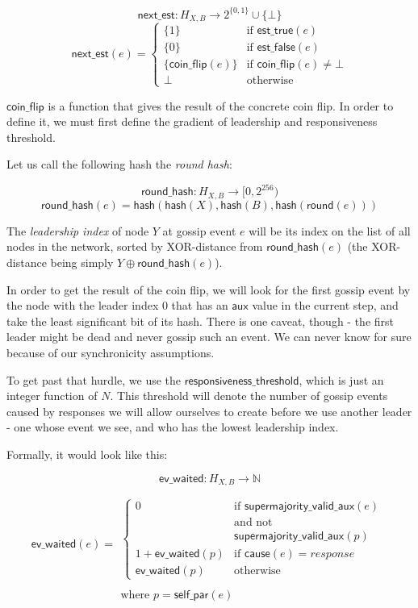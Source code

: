 \documentclass[a4paper,fleqn]{article}
\begin{document}
\[ \mathsf{next\_est}: H_{X,B} \to 2^{\{0,1\}} \cup \{ \bot \} \]
\[ \mathsf{next\_est}(e) = \left\{ \begin{array}{ll}
	\{1\} & \textrm{if $\mathsf{est\_true}(e)$} \\
	\{0\} & \textrm{if $\mathsf{est\_false}(e)$} \\
	\{\mathsf{coin\_flip}(e)\} & \textrm{if $\mathsf{coin\_flip}(e) \neq \bot$} \\
	\bot & \textrm{otherwise}
\end{array} \right. \]

$\mathsf{coin\_flip}$ is a function that gives the result of the concrete coin flip. In order to
define it, we must first define the gradient of leadership and responsiveness threshold.

Let us call the following hash the \emph{round hash}:

\[ \mathsf{round\_hash}: H_{X,B} \to [0, 2^{256}) \]
\[ \mathsf{round\_hash}(e) = \mathsf{hash}( \mathsf{hash}(X), \mathsf{hash}(B),
	\mathsf{hash}(\mathsf{round}(e))) \]

The \emph{leadership index} of node $Y$ at gossip event $e$ will be its index on the list of all
nodes in the network, sorted by XOR-distance from $\mathsf{round\_hash}(e)$ (the XOR-distance being
simply $Y \oplus \mathsf{round\_hash}(e)$).

In order to get the result of the coin flip, we will look for the first gossip event by the node
with the leader index 0 that has an $\mathsf{aux}$ value in the current step, and take the least
significant bit of its hash. There is one caveat, though - the first leader might be dead and never
gossip such an event. We can never know for sure because of our synchronicity assumptions.

To get past that hurdle, we use the $\mathsf{responsiveness\_threshold}$, which is just an integer
function of $N$. This threshold will denote the number of gossip events caused by responses we will
allow ourselves to create before we use another leader - one whose event we see, and who has the
lowest leadership index.

Formally, it would look like this:

\[ \mathsf{ev\_waited}: H_{X,B} \to \mathbb{N} \]
\[ \mathsf{ev\_waited}(e) = \begin{array}{l}
	\\
	\\
	\left\{ \begin{array}{ll}
		0 & \textrm{if $\mathsf{supermajority\_valid\_aux}(e)$} \\
		& \textrm{and not} \\
		& \mathsf{supermajority\_valid\_aux}(p) \\
		1 + \mathsf{ev\_waited}(p) & \textrm{if $\mathsf{cause}(e) = response$} \\
		\mathsf{ev\_waited}(p) & \textrm{otherwise}
	\end{array}\right. \\
	\\
	\textrm{where $p = \mathsf{self\_par}(e)$}
\end{array}\]
\end{document}
